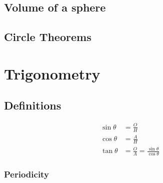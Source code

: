 \documentclass[fleqn,a4paper,11pt]{article}
\begin{document}
    \subsection{Volume of a sphere}

    \subsection{Circle Theorems}

    \section{Trigonometry}

    \subsection{Definitions} \label{sec:trig_definitions}


    \begin{align}
    \sin \theta &= \frac OH \\
    \cos \theta &= \frac AH \\
    \tan \theta &= \frac OA = \frac{\sin \theta}{\cos \theta}
    \end{align}

    \subsubsection{Periodicity} \label{sec:trig_periodic}

\end{document}

